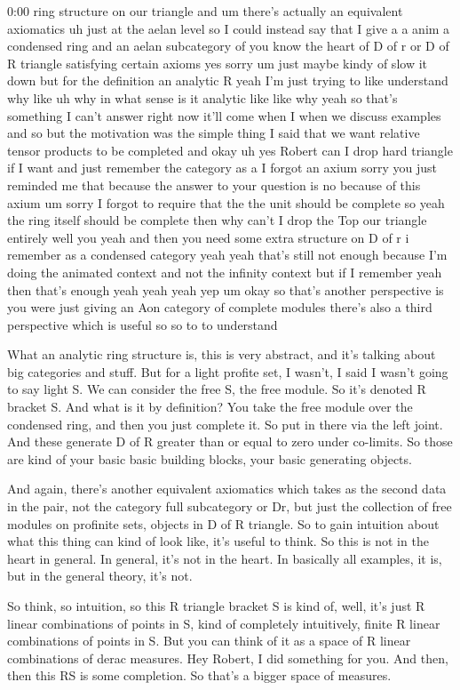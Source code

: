 \begin{unfinished}{0:00}
ring structure on our triangle and um there's actually an equivalent axiomatics uh just at the aelan level so I could instead say that I give a a anim a condensed ring and an aelan subcategory of you know the heart of D of r or D of R triangle satisfying certain axioms yes sorry um just maybe kindy of slow it down but for the definition an analytic R yeah I'm just trying to like understand why like uh why in what sense is it analytic like like why yeah so that's something I can't answer right now it'll come when I when we discuss examples and so but the motivation was the simple thing I said that we want relative tensor products to be completed and okay uh yes Robert can I drop hard triangle if I want and just remember the category as a I forgot an axium sorry you just reminded me that because the answer to your question is no because of this axium um sorry I forgot to require that the the unit should be complete so yeah the ring itself should be complete then why can't I drop the Top our triangle entirely well you yeah and then you need some extra structure on D of r i remember as a condensed category yeah yeah that's still not enough because I'm doing the animated context and not the infinity context but if I remember yeah then that's enough yeah yeah yeah yep um okay so that's another perspective is you were just giving an Aon category of complete modules there's also a third perspective which is useful so so to to understand

What an analytic ring structure is, this is very abstract, and it's talking about big categories and stuff. But for a light profite set, I wasn't, I said I wasn't going to say light S. We can consider the free S, the free module. So it's denoted R bracket S. And what is it by definition? You take the free module over the condensed ring, and then you just complete it. So put in there via the left joint. And these generate D of R greater than or equal to zero under co-limits. So those are kind of your basic basic building blocks, your basic generating objects. 

And again, there's another equivalent axiomatics which takes as the second data in the pair, not the category full subcategory or Dr, but just the collection of free modules on profinite sets, objects in D of R triangle. So to gain intuition about what this thing can kind of look like, it's useful to think. So this is not in the heart in general. In general, it's not in the heart. In basically all examples, it is, but in the general theory, it's not. 

So think, so intuition, so this R triangle bracket S is kind of, well, it's just R linear combinations of points in S, kind of completely intuitively, finite R linear combinations of points in S. But you can think of it as a space of R linear combinations of derac measures. Hey Robert, I did something for you. And then, then this RS is some completion. So that's a bigger space of measures. 


\end{unfinished}
